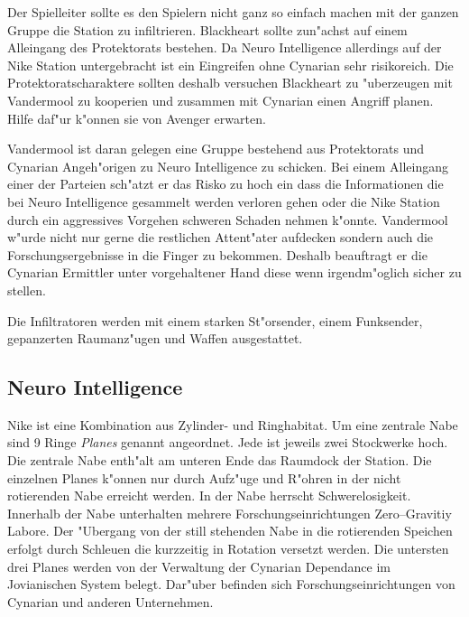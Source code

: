 \begin{remarks}
Der Spielleiter sollte es den Spielern nicht ganz so einfach machen mit der ganzen Gruppe die Station zu infiltrieren. Blackheart sollte zun"achst auf einem Alleingang des Protektorats bestehen. Da Neuro Intelligence allerdings auf der Nike Station untergebracht ist ein Eingreifen ohne Cynarian sehr risikoreich. Die Protektoratscharaktere sollten deshalb versuchen Blackheart zu "uberzeugen mit Vandermool zu kooperien und zusammen mit Cynarian einen Angriff planen. Hilfe daf"ur k"onnen sie von Avenger erwarten.

Vandermool ist daran gelegen eine Gruppe bestehend aus Protektorats und Cynarian Angeh"origen zu Neuro Intelligence zu schicken. Bei einem Alleingang einer der Parteien sch"atzt er das Risko zu hoch ein dass die Informationen die bei Neuro Intelligence gesammelt werden verloren gehen oder die Nike Station durch ein aggressives Vorgehen schweren Schaden nehmen k"onnte. Vandermool w"urde nicht nur gerne die restlichen Attent"ater aufdecken sondern auch die Forschungsergebnisse in die Finger zu bekommen. Deshalb beauftragt er die Cynarian Ermittler unter vorgehaltener Hand diese wenn irgendm"oglich sicher zu stellen.

Die Infiltratoren werden mit einem starken St"orsender, einem Funksender, gepanzerten Raumanz"ugen und Waffen ausgestattet.
\end{remarks}

\subsection{Neuro Intelligence}

Nike ist eine Kombination aus Zylinder- und Ringhabitat. Um eine zentrale Nabe sind 9 Ringe \emph{Planes} genannt angeordnet. Jede ist jeweils zwei Stockwerke hoch. Die zentrale Nabe enth"alt am unteren Ende das Raumdock der Station.  Die einzelnen Planes k"onnen nur durch Aufz"uge und R"ohren in der nicht rotierenden Nabe erreicht werden. In der Nabe herrscht Schwerelosigkeit. Innerhalb der Nabe unterhalten mehrere Forschungseinrichtungen Zero--Gravitiy Labore. Der "Ubergang von der still stehenden Nabe in die rotierenden Speichen erfolgt durch Schleu\3en die kurzzeitig in Rotation versetzt werden. Die untersten drei Planes werden von der Verwaltung der Cynarian Dependance im Jovianischen System belegt. Dar"uber befinden sich Forschungseinrichtungen von Cynarian und anderen Unternehmen.

